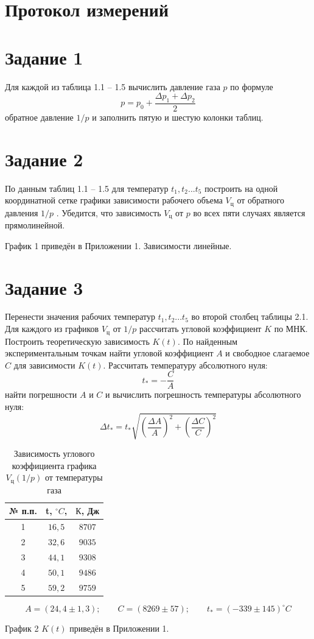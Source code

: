 \documentclass[11pt,a4paper]{article}
\begin{document}
\section{Протокол измерений}
\newpage
\section{Задание 1}
Для каждой из таблица 1.1 -- 1.5 вычислить давление газа $p$ по формуле
\begin{equation}
	p = p_0 + \frac{\Delta p_1 + \Delta p_2}{2}
\end{equation}
обратное давление $1/p$ и заполнить пятую и шестую колонки таблиц.
\section{Задание 2}
По данным таблиц 1.1 -- 1.5 для температур $t_1 , t_2 ...  t_5$ построить на одной координатной сетке
графики зависимости рабочего объема $V_ц$ от обратного давления $1/p$ . Убедится, что
зависимость $V_ц$ от $p$ во всех пяти случаях является прямолинейной.

График 1 приведён в Приложении 1. Зависимости линейные.
\section{Задание 3}
Перенести значения рабочих температур $t_1 , t_2 ...  t_5$ во второй столбец таблицы 2.1. Для
каждого из графиков $V_ц$ от $1/p$ рассчитать угловой коэффициент $K$ по МНК. Построить теоретическую зависимость $K(t)$. По найденным экспериментальным точкам найти угловой коэффициент $A$ и
свободное слагаемое $C$ для зависимости $K(t)$. Рассчитать
температуру абсолютного нуля:
\begin{equation}
	t_* = - \frac{C}{A}
\end{equation}
найти погрешности $A$ и $C$ и вычислить погрешность
температуры абсолютного нуля:
\begin{equation}
	\Delta t_* = t_* \sqrt{\left(\frac{\Delta A}{A}\right)^2 + \left(\frac{\Delta C}{C}\right)^2}
\end{equation}
\begin{table}[H]
	\renewcommand\thetable{1.1}
	\caption{Зависимость углового коэффициента графика $V_ц(1/p)$ от температуры газа}
	\centering
	\begin{tabular}{|c|c|c|}
		\hline
		№ п.п. & t, $^\circ C$, & $К$, Дж\\
		\hline
		1 & $16,5$ & $8707$\\
		\hline
		2 & $32,6$ & $9035$\\
		\hline
		3 & $44,1$ & $9308$\\
		\hline
		4 & $50,1$ & $9486$\\
		\hline
		5 & $59,2$ & $9759$\\
		\hline
	\end{tabular}

\begin{equation}
	A = (24,4 \pm 1,3); \qquad C = (8269 \pm 57); \qquad t_* = (-339 \pm 145)^\circ C
\end{equation}
\end{table}
График 2 $K(t)$ приведён в Приложении 1.
\end{document}
